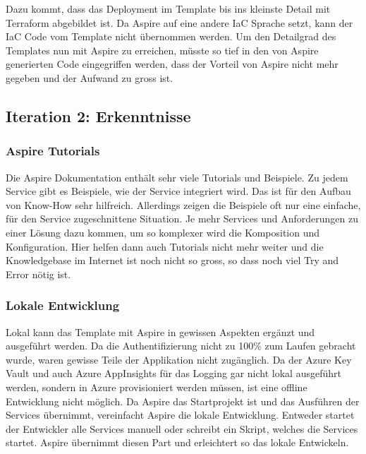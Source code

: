             Dazu kommt, dass das Deployment im Template bis ins kleinste Detail mit Terraform abgebildet ist. Da Aspire auf eine andere IaC Sprache setzt, kann der IaC Code vom Template nicht übernommen werden. Um den Detailgrad des Templates nun mit Aspire zu erreichen, müsste so tief in den von Aspire generierten Code eingegriffen werden, dass der Vorteil von Aspire nicht mehr gegeben und der Aufwand zu gross ist.
            
    \subsection{Iteration 2: Erkenntnisse}

        \subsubsection{Aspire Tutorials}
            Die Aspire Dokumentation enthält sehr viele Tutorials und Beispiele. Zu jedem Service gibt es Beispiele, wie der Service integriert wird. Das ist für den Aufbau von Know-How sehr hilfreich. Allerdings zeigen die Beispiele oft nur eine einfache, für den Service zugeschnittene Situation. Je mehr Services und Anforderungen zu einer Lösung dazu kommen, um so komplexer wird die Komposition und Konfiguration. Hier helfen dann auch Tutorials nicht mehr weiter und die Knowledgebase im Internet ist noch nicht so gross, so dass noch viel Try and Error nötig ist.

        \subsubsection{Lokale Entwicklung}
            Lokal kann das Template mit Aspire in gewissen Aspekten ergänzt und ausgeführt werden. Da die Authentifizierung nicht zu 100\% zum Laufen gebracht wurde, waren gewisse Teile der Applikation nicht zugänglich. Da der Azure Key Vault und auch Azure AppInsights für das Logging gar nicht lokal ausgeführt werden, sondern in Azure provisioniert werden müssen, ist eine offline Entwicklung nicht möglich. Da Aspire das Startprojekt ist und das Ausführen der Services übernimmt, vereinfacht Aspire die lokale Entwicklung. Entweder startet der Entwickler alle Services manuell oder schreibt ein Skript, welches die Services startet. Aspire übernimmt diesen Part und erleichtert so das lokale Entwickeln.


